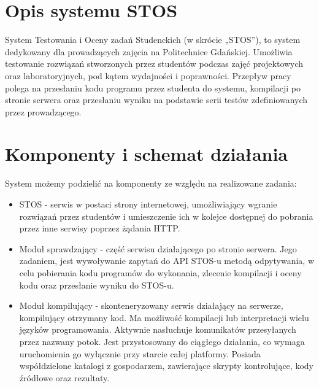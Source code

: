 \section{Opis systemu STOS}
\indent System Testowania i Oceny zadań Studenckich (w skrócie „STOS”), to system dedykowany dla prowadzących zajęcia na Politechnice Gdańskiej. Umożliwia testowanie rozwiązań stworzonych przez studentów podczas zajęć projektowych oraz laboratoryjnych, pod kątem wydajności i poprawności. Przepływ pracy polega na przesłaniu kodu programu przez studenta do systemu, kompilacji po stronie serwera oraz przesłaniu wyniku na podstawie serii testów zdefiniowanych przez prowadzącego.

\section{Komponenty i schemat działania}
System możemy podzielić na komponenty ze względu na realizowane zadania:
\begin{itemize}
    \item STOS - serwis w postaci strony internetowej, umożliwiający wgranie rozwiązań przez studentów i umieszczenie ich w kolejce dostępnej do pobrania przez inne serwisy poprzez żądania HTTP.
    \item Moduł sprawdzający - część serwisu działającego po stronie serwera. Jego zadaniem, jest wywoływanie zapytań do API STOS-u metodą odpytywania, w celu pobierania kodu programów do wykonania, zlecenie kompilacji i oceny kodu oraz przesłanie wyniku do STOS-u.
    \item Moduł kompilujący - skonteneryzowany serwis działający na serwerze, kompilujący otrzymany kod. Ma możliwość kompilacji lub interpretacji wielu języków programowania. Aktywnie nasłuchuje komunikatów przesyłanych przez nazwany potok. Jest przystosowany do ciągłego działania, co wymaga uruchomienia go wyłącznie przy starcie całej platformy. Posiada współdzielone katalogi z gospodarzem, zawierające skrypty kontrolujące, kody źródłowe oraz rezultaty.
\end{itemize}
